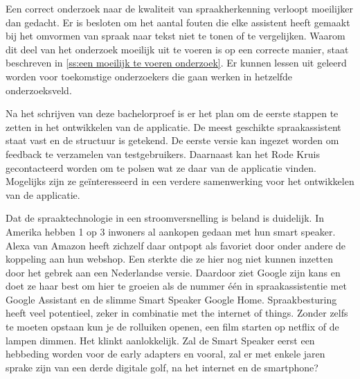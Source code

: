 Een correct onderzoek naar de kwaliteit van spraakherkenning verloopt moeilijker dan gedacht. Er is besloten om het aantal fouten die elke assistent heeft gemaakt bij het omvormen van spraak naar tekst niet te tonen of te vergelijken. Waarom dit deel van het onderzoek moeilijk uit te voeren is op een correcte manier, staat beschreven in \ref{ss:een moeilijk te voeren onderzoek}. Er kunnen lessen uit geleerd worden voor toekomstige onderzoekers die gaan werken in hetzelfde onderzoeksveld.

Na het schrijven van deze bachelorproef is er het plan om de eerste stappen te zetten in het ontwikkelen van de applicatie. De meest geschikte spraakassistent staat vast en de structuur is getekend. De eerste versie kan ingezet worden om feedback te verzamelen van testgebruikers. Daarnaast kan het Rode Kruis gecontacteerd worden om te polsen wat ze daar van de applicatie vinden. Mogelijks zijn ze geïnteresseerd in een verdere samenwerking voor het ontwikkelen van de applicatie.

Dat de spraaktechnologie in een stroomversnelling is beland is duidelijk. In Amerika hebben 1 op 3 inwoners al aankopen gedaan met hun smart speaker. Alexa van Amazon heeft zichzelf daar ontpopt als favoriet door onder andere de koppeling aan hun webshop. Een sterkte die ze hier nog niet kunnen inzetten door het gebrek aan een Nederlandse versie. Daardoor ziet Google zijn kans en doet ze haar best om hier te groeien als de nummer één in spraakassistentie met Google Assistant en de slimme Smart Speaker Google Home. Spraakbesturing heeft veel potentieel, zeker in combinatie met the internet of things. Zonder zelfs te moeten opstaan kun je de rolluiken openen, een film starten op netflix of de lampen dimmen. Het klinkt aanlokkelijk. Zal de Smart Speaker eerst een hebbeding worden voor de early adapters en vooral, zal er met enkele jaren sprake zijn van een derde digitale golf, na het internet en de smartphone?